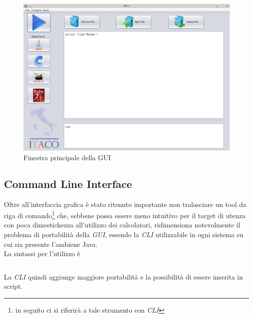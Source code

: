 \documentclass[11pt, a4paper, twoside, notitlepage]{report}
\begin{document}
\begin{figure}[h] \hspace*{30pt} 
\includegraphics[scale=0.5]{img/gui_itaco.png}
\caption{Finestra principale della GUI}
\end{figure}

\subsection{Command Line Interface}
Oltre all'interfaccia grafica è stato ritenuto importante non tralasciare un
tool da riga di comando\footnote{in seguito ci si riferirà a tale strumento
con \emph{CLI}} che, sebbene possa essere meno intuitivo per il target di utenza
con poca dimestichezza all'utilizzo dei calcolatori, ridimensiona notevolmente
il problema di portabilità della \emph{GUI}, essendo la \emph{CLI} utilizzabile
in ogni sistema su cui sia presente l'ambiene Java.
\\La sintassi per l'utilizzo è
\begin{verbatim}

\end{verbatim}
La \emph{CLI} quindi aggiunge maggiore portabilità e la possibilità di essere
inserita in script.
\end{document}
